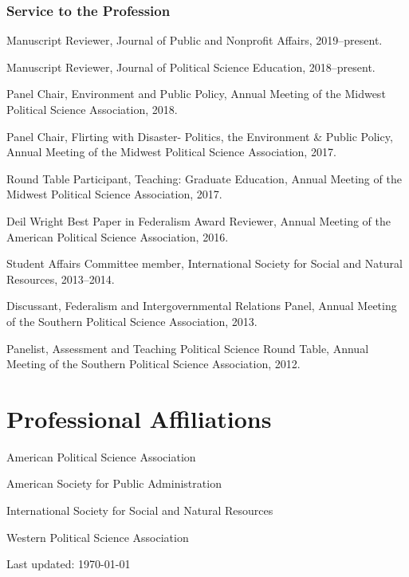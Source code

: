 \documentclass[12pt,letterpaper]{article}
\renewenvironment{itemize}{
  \begin{list}{}{
    \setlength{\leftmargin}{1.5em}
    \setlength{\itemsep}{0.25em}
    \setlength{\parskip}{0pt}
    \setlength{\parsep}{0.25em}
  }
}{
  \end{list}
}
\begin{document}
\subsubsection*{Service to the Profession}
\begin{itemize}\leftmargin=2pt\itemindent=-15pt
	\item Manuscript Reviewer, Journal of Public and Nonprofit Affairs, 2019--present.
	\item Manuscript Reviewer, Journal of Political Science Education, 2018--present.
	\item Panel Chair, Environment and Public Policy, Annual Meeting of the Midwest Political Science Association, 2018.
	\item Panel Chair, Flirting with Disaster- Politics, the Environment \& Public Policy, Annual Meeting of the Midwest Political Science Association, 2017. 
	\item Round Table Participant, Teaching: Graduate Education, Annual Meeting of the Midwest Political Science Association, 2017.
	\item Deil Wright Best Paper in Federalism Award Reviewer, Annual Meeting of the American Political Science Association, 2016.
	\item Student Affairs Committee member, International Society for Social and Natural Resources, 2013--2014.
	\item Discussant, Federalism and Intergovernmental Relations Panel, Annual Meeting of the Southern Political Science Association, 2013.
	\item Panelist, Assessment and Teaching Political Science Round Table, Annual Meeting of the Southern Political Science Association, 2012.
\end{itemize}

\section*{Professional Affiliations}
\begin{itemize}\leftmargin=2pt\itemindent=-15pt
	\item American Political Science Association
	\item American Society for Public Administration
	\item International Society for Social and Natural Resources
	\item Western Political Science Association
\end{itemize}

	
\vspace{2in}
\begin{center}
  \begin{small}
    Last updated: \today
      \end{small}
\end{center}
\end{document}
